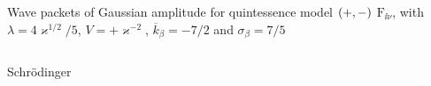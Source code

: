 \documentclass[9pt]{beamer}
\begin{document}
\begin{frame}%
{Wave packets of Gaussian amplitude for quintessence model ${\left(+,-\right)}$}%
{$\mathrm{F}_{\ii\nu}$, with $\lambda = 4\varkappa^{1/2}/5$,
$V = +\varkappa^{-2}$, $\overline{k}_\beta = -7/2$ and $\sigma_\beta = 7/5$}
\begin{columns}
\begin{column}{.49\textwidth}
\begin{block}{Schrödinger}

\end{block}
\end{column}
\end{columns}
\end{frame}
\end{document}
